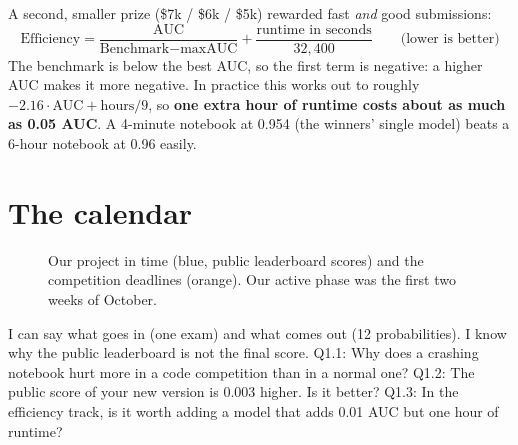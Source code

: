 A second, smaller prize (\$7k / \$6k / \$5k) rewarded fast \emph{and} good submissions:
\[
\text{Efficiency} = \frac{\text{AUC}}{\text{Benchmark} - \text{maxAUC}} + \frac{\text{runtime in seconds}}{32{,}400}
\qquad\text{(lower is better)}
\]
The benchmark is below the best AUC, so the first term is negative: a higher AUC makes it more negative.
In practice this works out to roughly $-2.16\cdot\text{AUC} + \text{hours}/9$, so \textbf{one extra hour of
runtime costs about as much as 0.05 AUC}. A 4-minute notebook at 0.954 (the winners' single model) beats a
6-hour notebook at 0.96 easily.

\section{The calendar}

\begin{figure}[H]
\centering
{}
\caption{Our project in time (blue, public leaderboard scores) and the competition deadlines (orange). Our
active phase was the first two weeks of October.}
\end{figure}

\begin{checkpoint}
\begin{itemize}
\done I can say what goes in (one exam) and what comes out (12 probabilities).
\done I know why the public leaderboard is not the final score.
\quiz Q1.1: Why does a crashing notebook hurt more in a code competition than in a normal one?
\quiz Q1.2: The public score of your new version is 0.003 higher. Is it better?
\quiz Q1.3: In the efficiency track, is it worth adding a model that adds 0.01 AUC but one hour of runtime?
\end{itemize}
\end{checkpoint}
